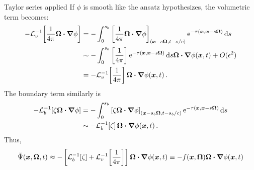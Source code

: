 \documentclass{beamer}
\begin{document}
\begin{frame}{Taylor series applied}
  If $\phi$ is smooth like the ansatz hypothesizes, the volumetric term becomes:
  \begin{align} \nonumber
  -\mathcal{L}_{v}^{-1}\!\left[ \frac{1}{4\pi} \bm{\Omega}\bm{\cdot} \bm{\nabla} \phi \right]
  &= -\int_{0}^{s_b}
    \left[ \frac{1}{4\pi} \bm{\Omega}\bm{\cdot} \bm{\nabla} \phi \right]_{(\bm{x} - s
    \bm{\Omega}, t-s/c)}
    \mathop{}\!\mathrm{e}^{ -\tau(\bm{x}, \bm{x} - s \bm{\Omega})}
    \mathop{}\!\mathrm{d} s
  \\\nonumber
  &\sim - \int_{0}^{s_b}
    \left[ \frac1{4\pi}\right]
    \mathop{}\!\mathrm{e}^{ -\tau(\bm{x}, \bm{x} - s \bm{\Omega})} \mathop{}\!\mathrm{d} s
    \bm{\Omega}\bm{\cdot} \bm{\nabla} \phi(\bm{x},t) + O(\epsilon^2)
  \\\label{eq:tildeS}
  &= - \mathcal{L}_{v}^{-1}\!\left[ \frac1{4\pi} \right] \bm{\Omega}\bm{\cdot} \bm{\nabla} \phi(\bm{x},t)\,.
  \end{align}
  The boundary term similarly is
  \begin{align} \nonumber
  - \mathcal{L}_{b}^{-1}\!\left[ \zeta \bm{\Omega}\bm{\cdot} \bm{\nabla} \phi \right]
  &= -\int_{0}^{s_b}
    \left[\zeta \bm{\Omega}\bm{\cdot} \bm{\nabla} \phi \right]_{(\bm{x} - s_b
    \bm{\Omega}, t-s_b/c)}
    \mathop{}\!\mathrm{e}^{ -\tau(\bm{x}, \bm{x} - s \bm{\Omega})}
    \mathop{}\!\mathrm{d} s
  \\ \label{eq:tildeB}
  &\sim - \mathcal{L}_{b}^{-1}\!\left[ \zeta \right]
  \bm{\Omega}\bm{\cdot} \bm{\nabla} \phi(\bm{x},t)\,.
  \end{align}
  Thus,
  \begin{equation}\label{eq:capPsiApprox}
    \tilde\Psi(\bm{x}, \bm{\Omega}, t) \approx
    - \left[ \mathcal{L}_{b}^{-1}\!\left[ \zeta \right]
    + \mathcal{L}_{v}^{-1}\!\left[ \frac1{4\pi} \right] \right]
    \bm{\Omega}\bm{\cdot} \bm{\nabla} \phi(\bm{x},t)
    \equiv -f(\bm{x}, \bm{\Omega}) \bm{\Omega}\bm{\cdot} \bm{\nabla} \phi(\bm{x},t)
  \end{equation}
\end{frame}
\end{document}

